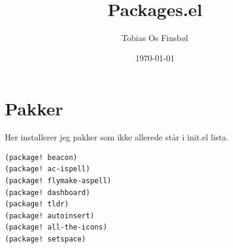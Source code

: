 \documentclass[11pt,a4paper]{article}
\author{Tobias Os Finsbøl}
\date{\today}
\title{Packages.el}
\begin{document}
\maketitle
\tableofcontents


\section{Pakker}
\label{sec:org53ea7d7}
Her installerer jeg pakker som ikke allerede står i init.el lista.
\begin{verbatim}
(package! beacon)
(package! ac-ispell)
(package! flymake-aspell)
(package! dashboard)
(package! tldr)
(package! autoinsert)
(package! all-the-icons)
(package! setspace)
\end{verbatim}
\end{document}
